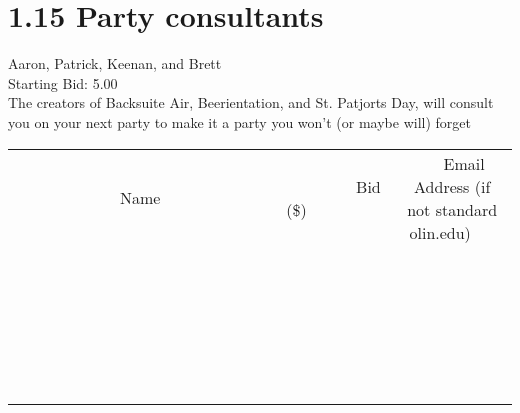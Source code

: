 \documentclass[11pt]{article}
\begin{document}
					\section*{1.15 Party consultants}
					Aaron, Patrick, Keenan, and Brett \\
					Starting Bid: 5.00 \\
					The creators of Backsuite Air, Beerientation, and St. Patjorts Day, will consult you on your next party to make it a party you won't (or maybe will) forget \\
					[6ex]
					\begin{tabular}{c c c}
						~~~~~~~~~~~~~Name~~~~~~~~~~~~~ & ~~~~~~~~~Bid (\$)~~~~~~~~~ & ~~~Email Address (if not standard olin.edu)~~~ \\
				
 & & \\
\hline
 & & \\
\hline
 & & \\
\hline
 & & \\
\hline
 & & \\
\hline
 & & \\
\hline
 & & \\
\hline
 & & \\
\hline
 & & \\
\hline
 & & \\
\hline
 & & \\
\hline
 & & \\
\hline
 & & \\
\hline
 & & \\
\hline
 & & \\
\hline
 & & \\
\hline
 & & \\
\hline
 & & \\
\hline
 & & \\
\hline
 & & \\
\hline
 & & \\
\hline
 & & \\
\hline
 & & \\
\hline
 & & \\
\hline
 & & \\
\hline
 & & \\
\hline
					\end{tabular}
					\clearpage
				
\end{document}

